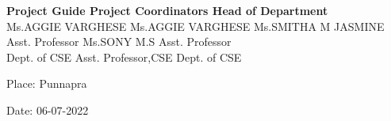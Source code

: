 \begin{titlepage}
		
	\textbf{Project Guide
		\hspace{0.9cm}
		Project Coordinators
		\hspace{0.35cm}
		Head of Department
	}\\
	Ms.AGGIE VARGHESE
	\hspace{0.2cm}
	Ms.AGGIE VARGHESE
	\hspace{0.4cm}
	Ms.SMITHA M JASMINE
	\newline \hspace{2cm}Asst. Professor
	\hspace{1.8cm}	Ms.SONY M.S\hspace{2.2cm}
	Asst. Professor\\
	Dept. of CSE
	\hspace{2cm}	
	Asst. Professor,CSE\hspace{1.3cm}	
	Dept. of CSE\\
	\vspace{2cm}
	
	Place: Punnapra
	\vspace{0.2cm}
	
	\par
	Date: 06-07-2022
	\vspace{2cm}
	
	

\end{titlepage}


